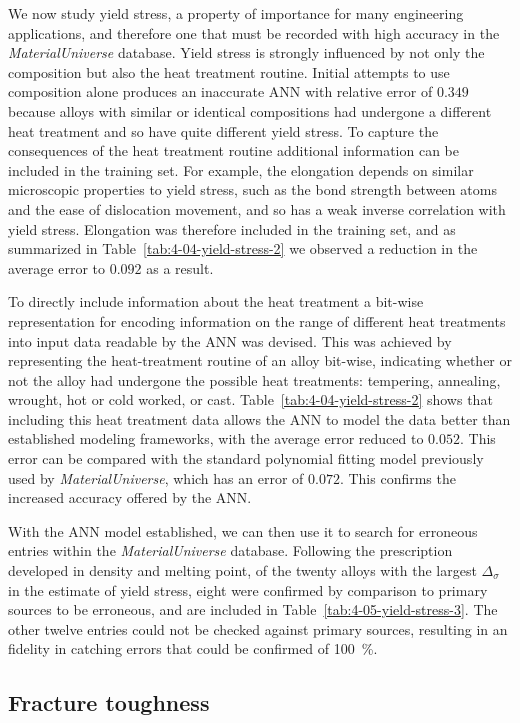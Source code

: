 \documentclass[review]{elsarticle}
\newcommand{\tabref}[1]{Table~\ref{#1}}
\begin{document}
We now study yield stress, a property of importance for many engineering
applications, and therefore one that must be recorded with high accuracy in
the \textit{MaterialUniverse} database. Yield stress is strongly influenced
by not only the composition but also the heat treatment routine. Initial
attempts to use composition alone produces an inaccurate ANN with relative
error of $0.349$ because alloys with similar or identical compositions had
undergone a different heat treatment and so have quite different yield
stress. To capture the consequences of the heat treatment routine additional
information can be included in the training set. For example, the elongation
depends on similar microscopic properties to yield stress, such as the bond
strength between atoms and the ease of dislocation movement, and so has a
weak inverse correlation with yield stress. Elongation was therefore
included in the training set, and as summarized in
\tabref{tab:4-04-yield-stress-2} we observed a reduction in the average
error to $0.092$ as a result.

To directly include information about the heat treatment a bit-wise
representation for encoding information on the range of different heat
treatments into input data readable by the ANN was devised. This was
achieved by representing the heat-treatment routine of an alloy
bit-wise, indicating whether or not the alloy had undergone the possible
heat treatments: tempering, annealing, wrought, hot or cold worked, or
cast. \tabref{tab:4-04-yield-stress-2} shows that including this heat
treatment data allows the ANN to model the data better than established
modeling frameworks, with the average error reduced to $0.052$. This error
can be compared with the standard polynomial fitting model previously used
by \textit{MaterialUniverse}, which has an error of $0.072$. This confirms
the increased accuracy offered by the ANN.

With the ANN model established, we can then use it to search for erroneous
entries within the \textit{MaterialUniverse} database. Following the
prescription developed in density and melting point, of the twenty alloys
with the largest $\Delta_\sigma$ in the estimate of yield stress, eight were
confirmed by comparison to primary sources to be erroneous, and are included
in \tabref{tab:4-05-yield-stress-3}. The other twelve entries could not be
checked against primary sources, resulting in an fidelity in catching errors
that could be confirmed of \SI{100}{\percent}.

\subsection{Fracture toughness}
\end{document}
